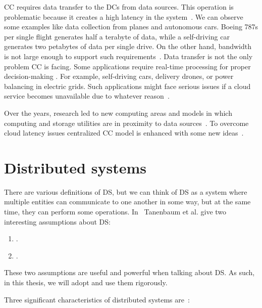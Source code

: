 CC requires data transfer to the DCs from data sources. This operation is problematic because it creates a high latency in the system~\cite{HossainRH18}. We can observe some examples like data collection from planes and autonomous cars. Boeing 787s per single flight generates half a terabyte of data, while a self-driving car generates two petabytes of data per single drive. On the other hand, bandwidth is not large enough to support such requirements~\cite{CaoZS18}. Data transfer is not the only problem CC is facing. Some applications require real-time processing for proper decision-making \cite{CaoZS18}. For example, self-driving cars, delivery drones, or power balancing in electric grids. Such applications might face serious issues if a cloud service becomes unavailable due to whatever reason~\cite{GunawiHSLSAE16}.

Over the years, research led to new computing areas and models in which computing and storage utilities are in proximity to data sources~\cite{Satyanarayanan17}. To overcome cloud latency issues centralized CC model is enhanced with some new ideas~\cite{NingLSY20}.
%
%
%
\section{Distributed systems}\label{sec:distributed_systems}
%
There are various definitions of DS, but we can think of DS as a system where multiple entities can communicate to one another in some way, but at the same time, they can perform some operations. In~\cite{SteenT16, 0019513} Tanenbaum et al. give two interesting assumptions about DS:

\begin{enumerate}[start=1,label={(\bfseries \arabic*)}]
	\item  {}.
	\item {}.\label{ds:asumption_2}
\end{enumerate}

\noindent
These two assumptions are useful and powerful when talking about DS. As such, in this thesis, we will adopt and use them rigorously.

Three significant characteristics of distributed systems are~\cite{0019513}: 

